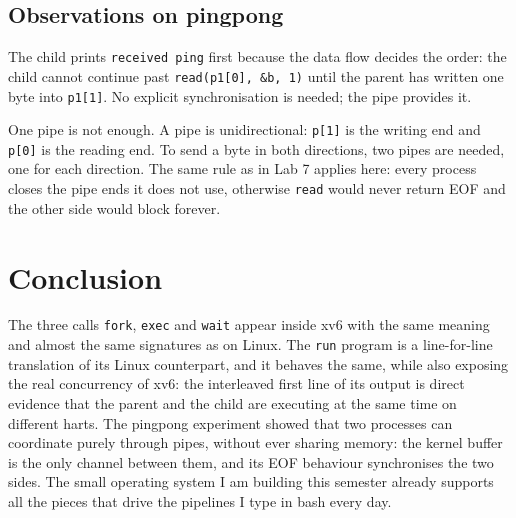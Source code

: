 \documentclass[12pt,a4paper]{article}
\begin{document}
\subsection{Observations on pingpong}

The child prints \texttt{received ping} first because the data flow decides the order: the child cannot continue past \texttt{read(p1[0], \&b, 1)} until the parent has written one byte into \texttt{p1[1]}. No explicit synchronisation is needed; the pipe provides it.

One pipe is not enough. A pipe is unidirectional: \texttt{p[1]} is the writing end and \texttt{p[0]} is the reading end. To send a byte in both directions, two pipes are needed, one for each direction. The same rule as in Lab 7 applies here: every process closes the pipe ends it does not use, otherwise \texttt{read} would never return EOF and the other side would block forever.

\section*{Conclusion}

The three calls \texttt{fork}, \texttt{exec} and \texttt{wait} appear inside xv6 with the same meaning and almost the same signatures as on Linux. The \texttt{run} program is a line-for-line translation of its Linux counterpart, and it behaves the same, while also exposing the real concurrency of xv6: the interleaved first line of its output is direct evidence that the parent and the child are executing at the same time on different harts. The pingpong experiment showed that two processes can coordinate purely through pipes, without ever sharing memory: the kernel buffer is the only channel between them, and its EOF behaviour synchronises the two sides. The small operating system I am building this semester already supports all the pieces that drive the pipelines I type in bash every day.
\end{document}
